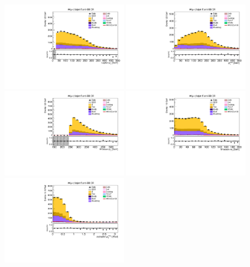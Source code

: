 \begin{figure}[tbp]
  \begin{center}
    \includegraphics[width=0.48\textwidth]{figures/wlnhbb2016/boosted/WmnWHTT1bFJCR_lepton1Pt.pdf}
    \includegraphics[width=0.48\textwidth]{figures/wlnhbb2016/boosted/WmnWHTT1bFJCR_pfmet.pdf}
    \includegraphics[width=0.48\textwidth]{figures/wlnhbb2016/boosted/WmnWHTT1bFJCR_topWBosonPt.pdf}
    \includegraphics[width=0.48\textwidth]{figures/wlnhbb2016/boosted/WmnWHTT1bFJCR_mT.pdf}
    \includegraphics[width=0.48\textwidth]{figures/wlnhbb2016/boosted/WmnWHTT1bFJCR_deltaPhiLep1Met.pdf}

\end{center}
\end{figure}
